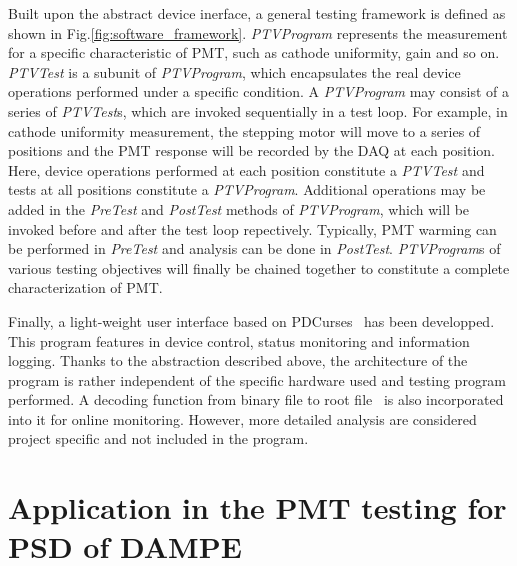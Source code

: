 \documentclass[review,number,sort&compress]{elsarticle}
\begin{document}
Built upon the abstract device inerface, a general testing framework is defined as shown in Fig.\ref{fig:software_framework}.
\textit{PTVProgram} represents the measurement for a specific characteristic of PMT, such as cathode uniformity, gain and so on.
\textit{PTVTest} is a subunit of \textit{PTVProgram}, which encapsulates the real device operations performed under a specific condition.
A \textit{PTVProgram} may consist of a series of \textit{PTVTest}s, which are invoked sequentially in a test loop.
For example, in cathode uniformity measurement, the stepping motor will move to a series of positions and the PMT response will be recorded by the DAQ at each position.
Here, device operations performed at each position constitute a \textit{PTVTest} and tests at all positions constitute a \textit{PTVProgram}.
Additional operations may be added in the \textit{PreTest} and \textit{PostTest} methods of \textit{PTVProgram}, which will be invoked before and after the test loop repectively.
Typically, PMT warming can be performed in \textit{PreTest} and analysis can be done in \textit{PostTest}.
\textit{PTVProgram}s of various testing objectives will finally be chained together to constitute a complete characterization of PMT.

Finally, a light-weight user interface based on PDCurses~\cite{pdcurses} has been developped.
This program features in device control, status monitoring and information logging.
Thanks to the abstraction described above, the architecture of the program is rather independent of the specific hardware used and testing program performed.
A decoding function from binary file to root file~\cite{root} is also incorporated into it for online monitoring.
However, more detailed analysis are considered project specific and not included in the program. 

\section{Application in the PMT testing for PSD of DAMPE}
\label{sec:application}
\end{document}
